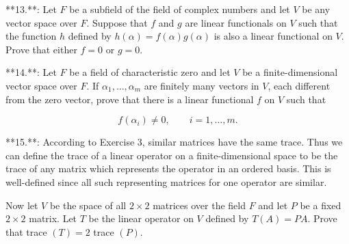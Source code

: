 **13.**: Let \(F\) be a subfield of the field of complex numbers and let \(V\) be any vector space over \(F\). Suppose that \(f\) and \(g\) are linear functionals on \(V\) such that the function \(h\) defined by \(h(\alpha)=f(\alpha)g(\alpha)\) is also a linear functional on \(V\). Prove that either \(f=0\) or \(g=0\).

**14.**: Let \(F\) be a field of characteristic zero and let \(V\) be a finite-dimensional vector space over \(F\). If \(\alpha_{1},\ldots,\alpha_{m}\) are finitely many vectors in \(V\), each different from the zero vector, prove that there is a linear functional \(f\) on \(V\) such that

\[f(\alpha_{i})\neq 0,\qquad i=1,\ldots,m.\]

**15.**: According to Exercise 3, similar matrices have the same trace. Thus we can define the trace of a linear operator on a finite-dimensional space to be the trace of any matrix which represents the operator in an ordered basis. This is well-defined since all such representing matrices for one operator are similar.

Now let \(V\) be the space of all \(2\times 2\) matrices over the field \(F\) and let \(P\) be a fixed \(2\times 2\) matrix. Let \(T\) be the linear operator on \(V\) defined by \(T(A)=PA\). Prove that trace \((T)=2\) trace \((P)\).

 